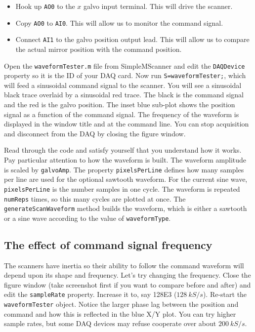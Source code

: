 \documentclass[a4paper]{report}
\begin{document}
\begin{itemize}
    \item Hook up \texttt{AO0} to the $x$ galvo input terminal. This will drive the scanner. 
    \item Copy \texttt{AO0} to \texttt{AI0}. This will allow us to monitor the command signal.
    \item Connect \texttt{AI1} to the galvo position output lead. This will allow us to compare the actual mirror position with the command position.
\end{itemize}

Open the \texttt{waveformTester.m} file from SimpleMScanner and edit the \texttt{DAQDevice} property so it is the ID of your DAQ card. 
Now run \texttt{S=waveformTester;}, which will feed a sinusoidal command signal to the scanner. 
You will see a sinusoidal black trace overlaid by a sinusoidal red trace. 
The black is the command signal and the red is the galvo position. 
The inset blue sub-plot shows the position signal as a function of the command signal. 
The frequency of the waveform is displayed in the window title and at the command line. 
You can stop acquisition and disconnect from the DAQ by closing the figure window.

Read through the code and satisfy yourself that you understand how it works. 
Pay particular attention to how the waveform is built. 
The waveform amplitude is scaled by \texttt{galvoAmp}.
The property \texttt{pixelsPerLine} defines how many samples per line are used for the optional sawtooth waveform. 
For the current sine wave, \texttt{pixelsPerLine} is the number samples in one cycle. 
The waveform is repeated \texttt{numReps} times, so this many cycles are plotted at once. 
The \texttt{generateScanWaveform} method builds the waveform, which is either a sawtooth or a sine wave according to the value of \texttt{waveformType}.


\subsection{The effect of command signal frequency}
The scanners have inertia so their ability to follow the command waveform will depend upon its shape and frequency. 
Let's try changing the frequency. 
Close the figure window (take screenshot first if you want to compare before and after) and edit the \texttt{sampleRate} property.
Increase it to, say 128E3 ($128~kS/s$). 
Re-start the \texttt{waveformTester} object. 
Notice the larger phase lag between the position and command and how this is reflected in the blue X/Y plot. 
You can try higher sample rates, but some DAQ devices may refuse cooperate over about $200~kS/s$.
\end{document}
